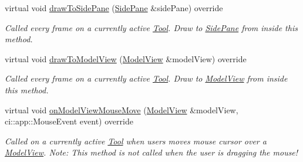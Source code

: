 \begin{DoxyCompactItemize}
virtual void \mbox{\hyperlink{classpepr3d_1_1_live_debug_a310f31d348b9437ff1c04e9ca830054d}{draw\+To\+Side\+Pane}} (\mbox{\hyperlink{classpepr3d_1_1_side_pane}{Side\+Pane}} \&side\+Pane) override
\begin{DoxyCompactList}\small\item\em Called every frame on a currently active \mbox{\hyperlink{classpepr3d_1_1_tool}{Tool}}. Draw to \mbox{\hyperlink{classpepr3d_1_1_side_pane}{Side\+Pane}} from inside this method. \end{DoxyCompactList}\item 
\mbox{\label{classpepr3d_1_1_live_debug_a52a05193e6b6a9d4f112af81be3d6683}} 
virtual void \mbox{\hyperlink{classpepr3d_1_1_live_debug_a52a05193e6b6a9d4f112af81be3d6683}{draw\+To\+Model\+View}} (\mbox{\hyperlink{classpepr3d_1_1_model_view}{Model\+View}} \&model\+View) override
\begin{DoxyCompactList}\small\item\em Called every frame on a currently active \mbox{\hyperlink{classpepr3d_1_1_tool}{Tool}}. Draw to \mbox{\hyperlink{classpepr3d_1_1_model_view}{Model\+View}} from inside this method. \end{DoxyCompactList}\item 
\mbox{\label{classpepr3d_1_1_live_debug_aaef30c7f133d6d4c9400add728cacbe5}} 
virtual void \mbox{\hyperlink{classpepr3d_1_1_live_debug_aaef30c7f133d6d4c9400add728cacbe5}{on\+Model\+View\+Mouse\+Move}} (\mbox{\hyperlink{classpepr3d_1_1_model_view}{Model\+View}} \&model\+View, ci\+::app\+::\+Mouse\+Event event) override
\begin{DoxyCompactList}\small\item\em Called on a currently active \mbox{\hyperlink{classpepr3d_1_1_tool}{Tool}} when users moves mouse cursor over a \mbox{\hyperlink{classpepr3d_1_1_model_view}{Model\+View}}. Note\+: This method is not called when the user is dragging the mouse! \end{DoxyCompactList}\end{DoxyCompactItemize}
